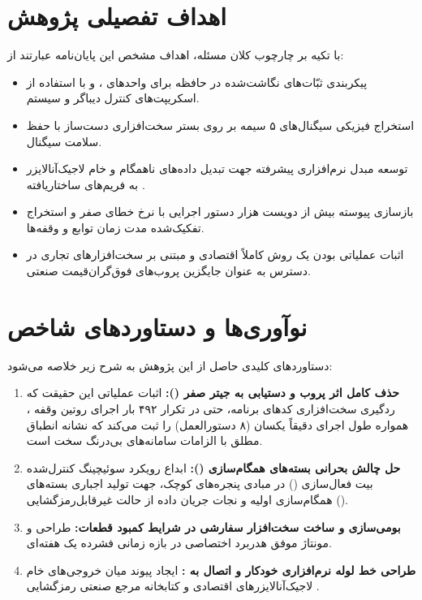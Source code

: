 \section{اهداف تفصیلی پژوهش}
با تکیه بر چارچوب کلان مسئله، اهداف مشخص این پایان‌نامه عبارتند از:
\begin{itemize}
    \item پیکربندی ثبّات‌های نگاشت‌شده در حافظه برای واحدهای ،  و  با استفاده از اسکریپت‌های کنترل دیباگر  و  سیستم.
    \item استخراج فیزیکی سیگنال‌های ۵ سیمه  بر روی بستر سخت‌افزاری دست‌ساز با حفظ سلامت سیگنال.
    \item توسعه مبدل نرم‌افزاری پیشرفته جهت تبدیل داده‌های ناهمگام و خام لاجیک‌آنالایزر به فریم‌های ساختاریافته .
    \item بازسازی پیوسته بیش از دویست هزار دستور اجرایی با نرخ خطای صفر و استخراج تفکیک‌شده مدت زمان توابع و وقفه‌ها.
    \item اثبات عملیاتی بودن یک روش کاملاً اقتصادی و مبتنی بر سخت‌افزارهای تجاری در دسترس به عنوان جایگزین پروب‌های فوق‌گران‌قیمت صنعتی.
\end{itemize}

\section{نوآوری‌ها و دستاوردهای شاخص}
دستاوردهای کلیدی حاصل از این پژوهش به شرح زیر خلاصه می‌شود:
\begin{enumerate}
    \item \textbf{حذف کامل اثر پروب و دستیابی به جیتر صفر ():} اثبات عملیاتی این حقیقت که ردگیری سخت‌افزاری کدهای برنامه، حتی در تکرار ۴۹۲ بار اجرای روتین وقفه ، همواره طول اجرای دقیقاً یکسان (۸ دستورالعمل) را ثبت می‌کند که نشانه انطباق مطلق با الزامات سامانه‌های بی‌درنگ سخت است.
    \item \textbf{حل چالش بحرانی بسته‌های همگام‌سازی ():} ابداع رویکرد سوئیچینگ کنترل‌شده بیت فعال‌سازی  () در مبادی پنجره‌های  کوچک، جهت تولید اجباری بسته‌های همگام‌سازی اولیه و نجات جریان داده از حالت غیرقابل‌رمزگشایی ().
    \item \textbf{بومی‌سازی و ساخت سخت‌افزار سفارشی در شرایط کمبود قطعات:} طراحی و مونتاژ موفق هدربرد اختصاصی  در بازه زمانی فشرده یک هفته‌ای.
    \item \textbf{طراحی خط لوله نرم‌افزاری خودکار و اتصال به :} ایجاد پیوند میان خروجی‌های خام لاجیک‌آنالایزرهای اقتصادی و کتابخانه مرجع صنعتی رمزگشایی .
\end{enumerate}

